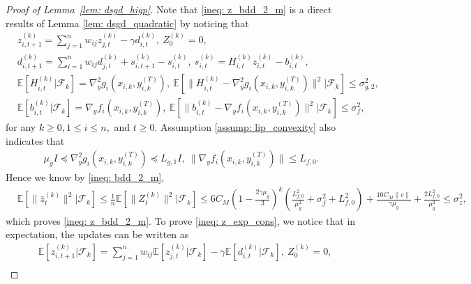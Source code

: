 \documentclass{article}
\theoremstyle{plain}
\theoremstyle{definition}
\theoremstyle{remark}
\newcommand{\E}{\mathbb{E}}
\newcommand{\F}{\mathcal{F}}
\begin{document}
\begin{proof}[Proof of Lemma~\ref{lem: dsgd_higp}]
    Note that \eqref{ineq: z_bdd_2_m} is a direct results of Lemma \ref{lem: dsgd_quadratic} by noticing that 
    \begin{align*}
        &z_{i,t+1}^{(k)} = \sum_{j=1}^{n}w_{ij}z_{j,t}^{(k)} - \gamma d_{i,t}^{(k)},\  Z_0^{(k)} = 0,\\
        &d_{i,t+1}^{(k)} =\sum_{i=1}^{n}w_{ij}d_{j,t}^{(k)} + s_{i,t+1}^{(k)} - s_{i,t}^{(k)},\ s_{i,t}^{(k)} = H_{i,t}^{(k)}z_{i,t}^{(k)}- b_{i,t}^{(k)}, \\
        &\E\left[H_{i,t}^{(k)}|\F_k\right] = \nabla_y^2g_i(x_{i,k},y_{i,k}^{(T)}) ,\ \E\left[\|H_{i,t}^{(k)}-\nabla_y^2g_i(x_{i,k},y_{i,k}^{(T)})\|^2|\F_k\right]\leq \sigma_{g,2}^2, \\
        &\E\left[b_{i,t}^{(k)}|\F_k\right] = \nabla_yf_i(x_{i,k},y_{i,k}^{(T)}),\ \E\left[\|b_{i,t}^{(k)} - \nabla_yf_i(x_{i,k}, y_{i,k}^{(T)})\|^2|\F_k\right]\leq \sigma_f^2,
    \end{align*}
    for any $k\geq 0, 1\leq i\leq n,$ and $t\geq 0$. Assumption \ref{assump: lip_convexity} also indicates that 
    \begin{align*}
        \mu_g I\preceq \nabla_y^2g_i(x_{i,k},y_{i,k}^{(T)})\preceq L_{g,1} I,\ \|\nabla_yf_i(x_{i,k},y_{i,k}^{(T)})\|\leq L_{f,0}.
    \end{align*}
    Hence we know by \eqref{ineq: bdd_2_m},
    \begin{align*}
        &\E\left[\|\bar{z}_t^{(k)}\|^2|\F_k\right]\leq \frac{1}{n}\E\left[\|Z_t^{(k)}\|^2|\F_k\right]\leq 6C_M\left(1-\frac{2\gamma\mu_g}{3}\right)^k\left(\frac{L_{f,0}^2}{\mu_g^2} + \sigma_{f}^2 + L_{f,0}^2\right) + \frac{10C_M\|c\|}{\gamma\mu_g} + \frac{2L_{f,0}^2}{\mu_g^2}\leq \sigma_z^2,
    \end{align*}
    which proves \eqref{ineq: z_bdd_2_m}. To prove \eqref{ineq: z_exp_cons}, we notice that in expectation, the updates can be written as
    \begin{align*}
        &\E\left[z_{i,t+1}^{(k)}|\F_k\right] = \sum_{j=1}^{n}w_{ij}\E\left[z_{j,t}^{(k)}|\F_k\right] - \gamma \E\left[d_{i,t}^{(k)}|\F_k\right],\  Z_0^{(k)} = 0,\\

\end{align*}
\end{proof}
\end{document}
